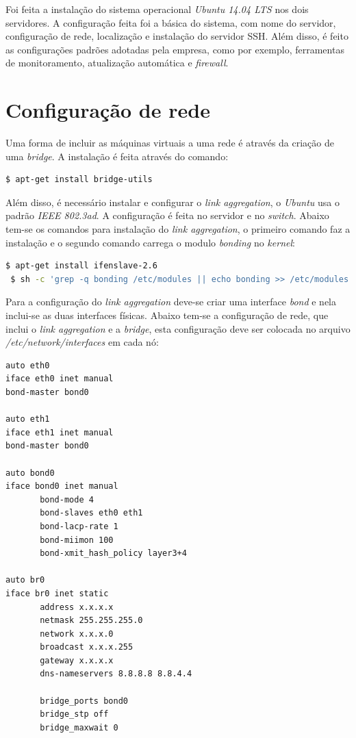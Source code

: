 Foi feita a instalação do sistema operacional \textit{Ubuntu 14.04 \ac{LTS}} nos dois servidores. A configuração feita foi a básica do sistema,
com nome do servidor, configuração de rede, localização e instalação do servidor \ac{SSH}.
Além disso, é feito as configurações padrões adotadas pela empresa, como por exemplo, ferramentas de monitoramento, atualização automática
e \textit{firewall}.

\section{Configuração de rede}

Uma forma de incluir as máquinas virtuais a uma rede é através da criação de uma \textit{bridge}. A instalação é feita através do comando:
\begin{lstlisting}[language=bash]
  $ apt-get install bridge-utils
\end{lstlisting}

Além disso, é necessário instalar e configurar o \textit{link aggregation}, o \textit{Ubuntu} usa o padrão \textit{IEEE 802.3ad}. A configuração 
é feita no servidor e no \textit{switch}. Abaixo tem-se os comandos para instalação do \textit{link aggregation}, o primeiro comando faz a 
instalação e o segundo comando carrega o modulo \textit{bonding} no \textit{kernel}:
\begin{lstlisting}[language=bash]
 $ apt-get install ifenslave-2.6
 $ sh -c 'grep -q bonding /etc/modules || echo bonding >> /etc/modules'
\end{lstlisting}

Para a configuração do \textit{link aggregation} deve-se criar uma interface \textit{bond} e nela inclui-se as duas interfaces físicas.
Abaixo tem-se a configuração de rede, que inclui o \textit{link aggregation} e a \textit{bridge}, esta configuração deve ser colocada no 
arquivo \textit{/etc/network/interfaces} em cada nó:
\begin{lstlisting}
auto eth0
iface eth0 inet manual
bond-master bond0

auto eth1
iface eth1 inet manual
bond-master bond0

auto bond0
iface bond0 inet manual
       bond-mode 4
       bond-slaves eth0 eth1
       bond-lacp-rate 1
       bond-miimon 100
       bond-xmit_hash_policy layer3+4

auto br0
iface br0 inet static
       address x.x.x.x
       netmask 255.255.255.0
       network x.x.x.0
       broadcast x.x.x.255
       gateway x.x.x.x
       dns-nameservers 8.8.8.8 8.8.4.4
       
       bridge_ports bond0
       bridge_stp off
       bridge_maxwait 0
\end{lstlisting}

